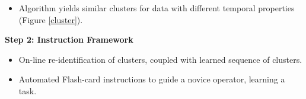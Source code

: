 \documentclass[portrait,a0paper,fontscale=0.28]{baposter} %
\begin{document}
\begin{poster}
{\begin{multicols}{2}
\begin{minipage}{.47\textwidth}
    \end{minipage}
    \begin{minipage}{.23\textwidth}
      \centering
    \end{minipage}
    \begin{minipage}{.23\textwidth}
      \centering
    \end{minipage}
    \label{seg}
    \begin{itemize}
    \item
      Algorithm yields similar clusters for data with different temporal properties (Figure \ref{cluster}). 
    \end{itemize}
    \begin{minipage}{.15\textwidth}
      \centering
    \end{minipage}
    \begin{minipage}{.15\textwidth}
      \centering
    \end{minipage}
    \begin{minipage}{.15\textwidth}
      \centering
    \end{minipage}
    \label{cluster}
    \textbf{Step 2: Instruction Framework}
    \begin{itemize}
    \item
      On-line re-identification of clusters, coupled with learned sequence of clusters.
    \item
      Automated Flash-card instructions to guide a novice operator, learning a task.
    \end{itemize}
    
    \begin{minipage}{.15\textwidth}
      \centering
    \end{minipage}
    \begin{minipage}{.15\textwidth}
      \centering
    \end{minipage}
    \begin{minipage}{.15\textwidth}
      \centering
    \end{minipage}
    

\end{multicols}}
\end{poster}
\end{document}
